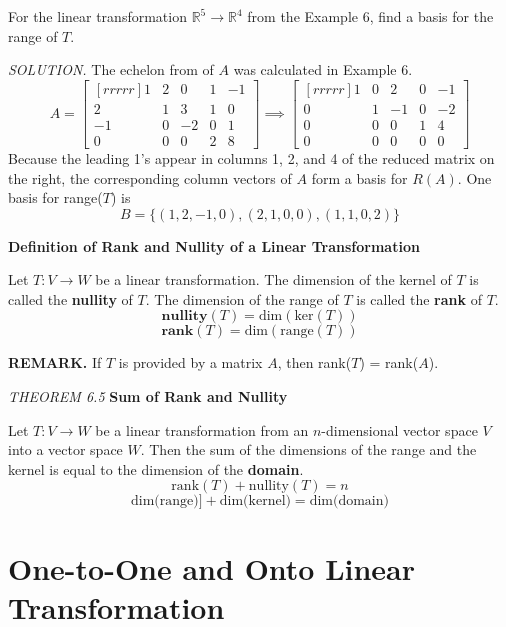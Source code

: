 \documentclass{article}
\newcommand\R{\mathbb{R}}
\newcounter{Def}[section]
\begin{document}
    For the linear transformation $ \R^5  \to \R^4 $ from the Example 6, find a basis for the range of $T$.

    \textit{\textcolor{blue5}{SOLUTION.}} The echelon from of $A$ was calculated in Example 6.
        \[A =
        \begin{bmatrix}[rrrrr]
        1 & 2 & 0 & 1 & -1\\
        2 & 1 & 3 & 1 & 0 \\
        -1 & 0 & -2 & 0 & 1\\
        0 & 0 & 0 & 2 & 8
    \end{bmatrix} \implies 
            \begin{bmatrix}[rrrrr]
        1 & 0 & 2 & 0 & -1  \\
        0 & 1 & -1 & 0 & -2  \\
        0 & 0 & 0 & 1 & 4  \\
        0 & 0 & 0 & 0 & 0 
    \end{bmatrix} \]
    Because the leading 1's appear in columns 1, 2, and 4 of the reduced matrix on the right, the corresponding 
    column vectors of $A$ form a basis for $R(A)$. One basis for range($T$) is
    \[ B = \{ (1,2,-1,0), (2,1,0,0), (1,1,0,2)\} \]
    \begin{tcolorbox}[colback = {blue9}]
        \textbf{Definition of Rank and Nullity of a Linear Transformation}

        Let $T: V \to W$ be a linear transformation. The dimension of the kernel of $T$ is called the \textbf{nullity} of $T$.
        The dimension of the range of $T$ is called the \textbf{rank} of $T$.
        \[ \textbf{nullity}(T) = \text{dim}(\text{ker}(T)) \]
        \[ \textbf{rank}(T) = \text{dim}(\text{range}(T)) \]
    \end{tcolorbox}
    \textbf{REMARK.} If $T$ is provided by a matrix $A$, then rank($T$) = rank($A$).
    \begin{tcolorbox}[colback = {blue9}]
        \textit{THEOREM 6.5} \textbf{Sum of Rank and Nullity}

        Let $T: V \to W$ be a linear transformation from an $n$-dimensional vector space $V$ into a vector space $W$. Then the sum
        of the dimensions of the range and the kernel is equal to the dimension of the \textbf{domain}.
        \[ \text{rank}(T) + \text{nullity}(T) = n \]
        \[\text{dim(range)}] + \text{dim(kernel)} = \text{dim(domain)} \]
    \end{tcolorbox}

    \section{One-to-One and Onto Linear Transformation}
\end{document}
